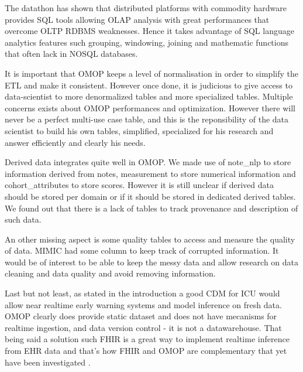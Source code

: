 The datathon has shown that distributed platforms with commodity hardware
provides SQL tools allowing OLAP analysis with great performances that overcome
OLTP RDBMS weaknesses. Hence it takes advantage of SQL language analytics
features such grouping, windowing, joining and mathematic functions that often
lack in NOSQL databases.

It is important that OMOP keeps a level of normalisation in order to simplify
the ETL and make it consistent. However once done, it is judicious to give
access to data-scientist to more denormalized tables and more specialized
tables. Multiple concerns exists about OMOP performances and optimization.
However there will never be a perfect multi-use case table, and this is the
reponsibility of the data scientist to build his own tables, simplified,
specialized for his research and answer efficiently and clearly his needs.

Derived data integrates quite well in OMOP. We made use of note\_nlp to store
information derived from notes, measurement to store numerical information and
cohort\_attributes to store scores. However it is still unclear if derived data
should be stored per domain or if it should be stored in dedicated derived
tables. We found out that there is a lack of tables to track provenance and
description of such data.

An other missing aspect is some quality tables to access and measure the
quality of data. MIMIC had some column to keep track of corrupted information.
It would be of interest to be able to keep the messy data and allow research on
data cleaning and data quality and avoid removing information.

Last but not least, as stated in the introduction a good CDM for ICU would
allow near realtime early warning systems and model inference on fresh data.
OMOP clearly does provide static dataset and does not have mecanisms for
realtime ingestion, and data version control - it is not a datawarehouse. That
being said a solution such FHIR is a great way to implement realtime inference
from EHR data and that's how FHIR and OMOP are complementary that yet have been
investigated \cite{gatech}.
